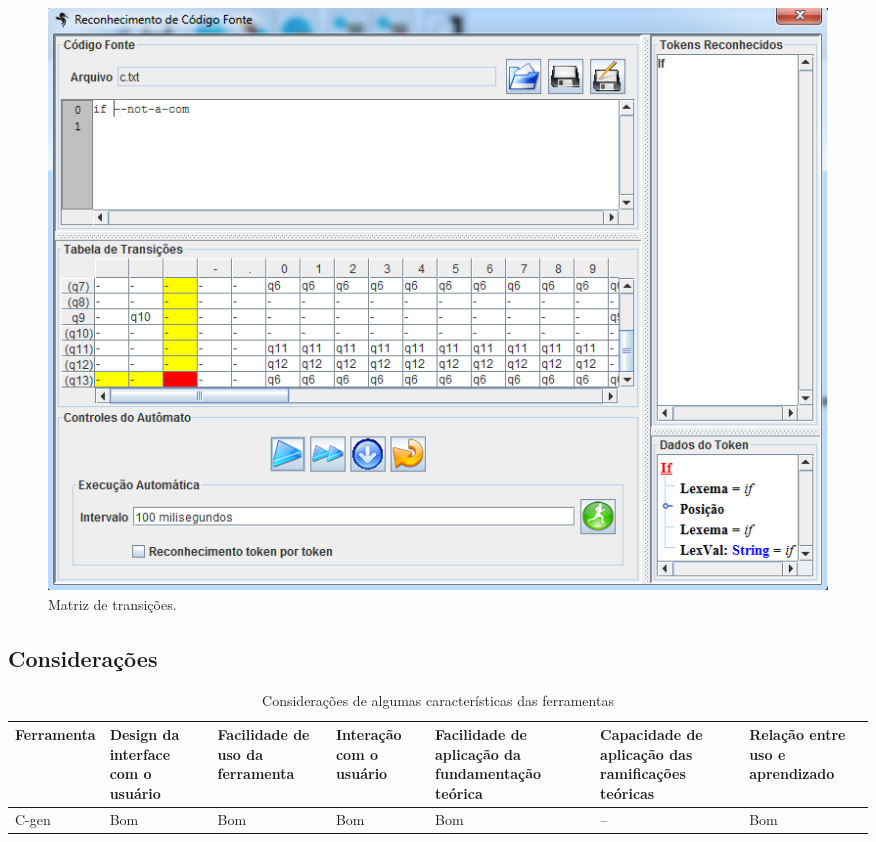 \newpage
\begin{figure}[ht!]
	\centering
	\includegraphics[scale=0.5]{imgs/cgen4.png}
	\caption{Matriz de transições.}
	\label{cgen-matriz}
\end{figure}

\subsection{Considerações}
\label{sub:cgen-consideracoes}

\begin{table}[ht]
\caption{Considerações de algumas características das ferramentas}
\centering
\begin{tabular}{|m{1.6cm}|m{1.5cm}|m{1.5cm}|m{1.5cm}|m{1.5cm}|m{1.8cm}|m{1.5cm}|}  \hline
   Ferramenta & Design da interface com o usuário & Facilidade de uso da ferramenta & Interação com o usuário & Facilidade de aplicação da fundamentação teórica & Capacidade de aplicação das ramificações teóricas & Relação entre uso e aprendizado \\ \hline
C-gen & Bom & Bom & Bom & Bom & -- & Bom \\ \hline
\end{tabular}
\label{table:caracteristicas}
\end{table}


